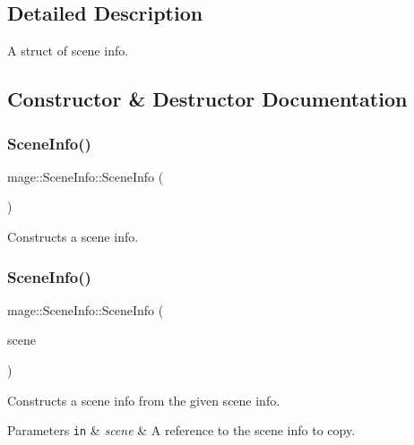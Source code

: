 \subsection{Detailed Description}
A struct of scene info. 

\subsection{Constructor \& Destructor Documentation}
\hypertarget{structmage_1_1_scene_info_a8e5b36e32f72ab71aca27f213604e232}{}\label{structmage_1_1_scene_info_a8e5b36e32f72ab71aca27f213604e232} 
\subsubsection{\texorpdfstring{Scene\+Info()}{SceneInfo()}\hspace{0.1cm}{\footnotesize\ttfamily [1/3]}}
{\footnotesize\ttfamily mage\+::\+Scene\+Info\+::\+Scene\+Info (\begin{DoxyParamCaption}{ }\end{DoxyParamCaption})}

Constructs a scene info. \hypertarget{structmage_1_1_scene_info_a8865f17176d3ec4592348bfa9ea40b66}{}\label{structmage_1_1_scene_info_a8865f17176d3ec4592348bfa9ea40b66} 
\subsubsection{\texorpdfstring{Scene\+Info()}{SceneInfo()}\hspace{0.1cm}{\footnotesize\ttfamily [2/3]}}
{\footnotesize\ttfamily mage\+::\+Scene\+Info\+::\+Scene\+Info (\begin{DoxyParamCaption}\item[{const \hyperlink{structmage_1_1_scene_info}{Scene\+Info} \&}]{scene }\end{DoxyParamCaption})\hspace{0.3cm}{\ttfamily [default]}}

Constructs a scene info from the given scene info.


\begin{DoxyParams}[1]{Parameters}
\mbox{\tt in}  & {\em scene} & A reference to the scene info to copy. \\
\hline
\end{DoxyParams}
\hypertarget{structmage_1_1_scene_info_a65fcf70d034db7f6d1153971a39af6f8}{}\label{structmage_1_1_scene_info_a65fcf70d034db7f6d1153971a39af6f8} 
